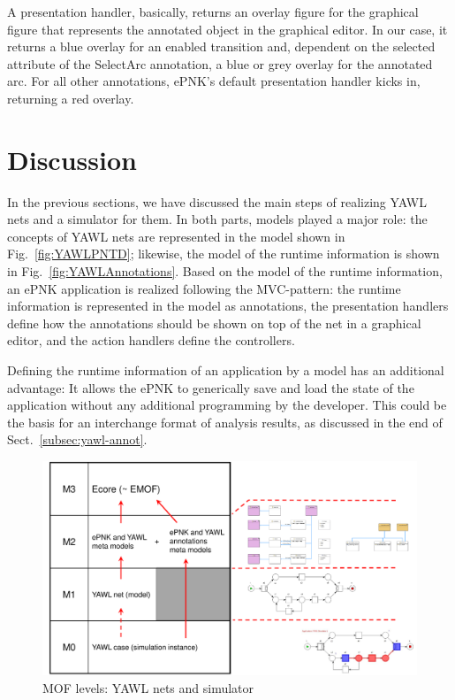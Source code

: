\documentclass[a4paper]{llncs}
\begin{document}
A presentation handler, basically, returns an overlay figure for the 
graphical figure that represents the annotated object in the graphical editor. In our
case, it returns a blue overlay for an enabled transition and, dependent on the
{\sf selected} attribute of the {\sf SelectArc} annotation, a blue or grey overlay for
the annotated arc.
For all other annotations, ePNK's default presentation handler kicks in, returning
a red overlay.

\section{Discussion}
\label{sec:discussion}

In the previous sections, we have discussed the main steps of realizing
YAWL nets and a simulator for them. In both parts, models
played a major role: the concepts of YAWL nets are represented in the model
shown in Fig.~\ref{fig:YAWLPNTD}; likewise, the model of the runtime
information is shown in Fig.~\ref{fig:YAWLAnnotations}.
Based on the model of the runtime information, an ePNK application is
realized following the MVC-pattern: the runtime information is represented
in the model as annotations, the presentation handlers define how the annotations
should be shown on top of the net in a graphical editor, and the action handlers
define the controllers. 

Defining the runtime information of an application by a model has an additional
advantage: It allows the ePNK to generically save and load the state of the
application without any additional programming by the developer.
This could be the basis for an interchange format of analysis results,
as  discussed in the end of Sect.~\ref{subsec:yawl-annot}.

\begin{figure}[tb!!]
  \centerline{\includegraphics[scale=.48]{MOF-YAWL}}
  \caption{MOF levels: YAWL nets and simulator}
  \label{fig:MOF-YAWL}
\end{figure}
\end{document}
